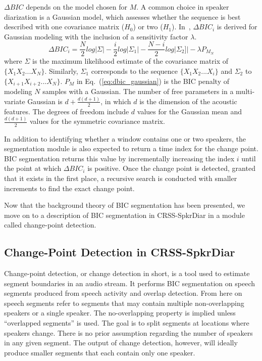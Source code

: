 $\Delta BIC$ depends on the model chosen for $M$. 
A common choice in speaker diarization is a Gaussian model, which assesses whether the sequence is best described with one covariance matrix ($H_0$) or two ($H_1$). 
In~\cite{cettolo2005evaluation}, $\Delta BIC_i$ is derived for Gaussian modeling with the inclusion of a sensitivity factor $\lambda$. 
\begin{equation}
\label{eq:dbic_gaussian}
\Delta BIC_i = \frac{N}{2} log |\Sigma| - \frac{i}{2} log |\Sigma_1| - \frac{N-i}{2}log |\Sigma_2]| - \lambda P_{M_N}
\end{equation}
where $\Sigma$ is the maximum likelihood estimate of the covariance matrix of $\{X_1X_2...X_N\}$. Similarly, $\Sigma_1$ corresponds to the sequence $\{X_1X_2...X_i\}$ and $\Sigma_2$ to $\{X_{i+1}X_{i+2}...X_N\}$. 
$P_M$ in Eq.~(\ref{eq:dbic_gaussian}) is the BIC penalty of modeling $N$ samples with a Gaussian. 
The number of free parameters in a multi-variate Gaussian is $d + \frac{d(d+1)}{2}$, in which $d$ is the dimension of the acoustic features. 
The degrees of freedom include $d$ values for the Gaussian mean and $\frac{d(d+1)}{2}$ values for the symmetric covariance matrix. 

In addition to identifying whether a window contains one or two speakers, the segmentation module is also expected to return a time index for the change point. 
BIC segmentation returns this value by incrementally increasing the index $i$ until the point at which $\Delta BIC_i$ is positive. 
Once the change point is detected, granted that it exists in the first place, a recursive search is conducted with smaller increments to find the exact change point. 

Now that the background theory of BIC segmentation has been presented, we move on to a description of BIC segmentation in CRSS-SpkrDiar in a module called change-point detection. 

\subsection{Change-Point Detection in CRSS-SpkrDiar}
Change-point detection, or change detection in short, is a tool used to estimate segment boundaries in an audio stream. 
It performs BIC segmentation on speech segments produced from speech activity and overlap detection. 
From here on speech segments refer to segments that may contain multiple non-overlapping speakers or a single speaker. 
The no-overlapping property is implied unless ``overlapped segments'' is used. 
The goal is to split segments at locations where speakers change. 
There is no prior assumption regarding the number of speakers in any given segment. 
The output of change detection, however, will ideally produce smaller segments that each contain only one speaker. 

